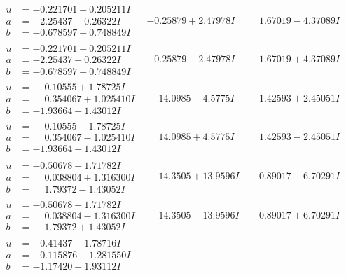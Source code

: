 \documentclass[1p]{elsarticle_modified}
\theoremstyle{definition}
\begin{document}
$$\begin{array}{c|c|c}
\begin{aligned}
u &= -0.221701 + 0.205211 I \\
a &= -2.25437 - 0.26322 I \\
b &= -0.678597 + 0.748849 I\end{aligned}
 & -0.25879 + 2.47978 I & \phantom{-}1.67019 - 4.37089 I \\ \hline\begin{aligned}
u &= -0.221701 - 0.205211 I \\
a &= -2.25437 + 0.26322 I \\
b &= -0.678597 - 0.748849 I\end{aligned}
 & -0.25879 - 2.47978 I & \phantom{-}1.67019 + 4.37089 I \\ \hline\begin{aligned}
u &= \phantom{-}0.10555 + 1.78725 I \\
a &= \phantom{-}0.354067 + 1.025410 I \\
b &= -1.93664 - 1.43012 I\end{aligned}
 & \phantom{-}14.0985 - 4.5775 I & \phantom{-}1.42593 + 2.45051 I \\ \hline\begin{aligned}
u &= \phantom{-}0.10555 - 1.78725 I \\
a &= \phantom{-}0.354067 - 1.025410 I \\
b &= -1.93664 + 1.43012 I\end{aligned}
 & \phantom{-}14.0985 + 4.5775 I & \phantom{-}1.42593 - 2.45051 I \\ \hline\begin{aligned}
u &= -0.50678 + 1.71782 I \\
a &= \phantom{-}0.038804 + 1.316300 I \\
b &= \phantom{-}1.79372 - 1.43052 I\end{aligned}
 & \phantom{-}14.3505 + 13.9596 I & \phantom{-}0.89017 - 6.70291 I \\ \hline\begin{aligned}
u &= -0.50678 - 1.71782 I \\
a &= \phantom{-}0.038804 - 1.316300 I \\
b &= \phantom{-}1.79372 + 1.43052 I\end{aligned}
 & \phantom{-}14.3505 - 13.9596 I & \phantom{-}0.89017 + 6.70291 I \\ \hline\begin{aligned}
u &= -0.41437 + 1.78716 I \\
a &= -0.115876 - 1.281550 I \\
b &= -1.17420 + 1.93112 I\end{aligned}

\end{array}$$
\end{document}

